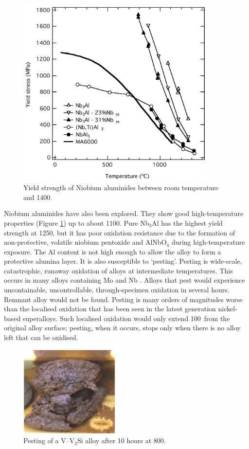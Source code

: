 %
\begin{figure}[H]
\begin{center}
\includegraphics[width=10cm]{nbalys}
\caption{Yield strength of Niobium aluminides between room temperature and 1400\celsius.}
\label{fig:nbalys}
\end{center}
\end{figure}
%
Niobium aluminides have also been explored.  They show good high-temperature properties (Figure \ref{fig:nbalys}) up to about 1100\celsius.  Pure Nb$_3$Al has the highest yield strength at 1250\celsius, but it has poor oxidation resistance due to the formation of non-protective, volatile niobium pentoxide and AlNbO$_4$ during high-temperature exposure.  The Al content is not high enough to allow the alloy to form a protective alumina layer.  It is also susceptible to `pesting'.  Pesting is wide-scale, catastrophic, runaway oxidation of alloys at intermediate temperatures.  This occurs in many alloys containing Mo and Nb \cite{bewlay03, nesbitt93, ochiai06, shah92}.  Alloys that pest would experience uncontainable, uncontrollable, through-specimen oxidation in several hours.  Remnant alloy would not be found.  Pesting is many orders of magnitudes worse than the localised oxidation that has been seen in the latest generation nickel-based superalloys. Such localised oxidation would only extend 100\micro\metre\ from the original alloy surface; pesting, when it occurs, stops only when there is no alloy left that can be oxidised.


%
\begin{figure}[H]
\begin{center}
\includegraphics[width=5cm]{pest}
\caption{Pesting of a V--V$_3$Si alloy after 10 hours at 800\celsius.}
\label{fig:pest}
\end{center}
\end{figure}
%

